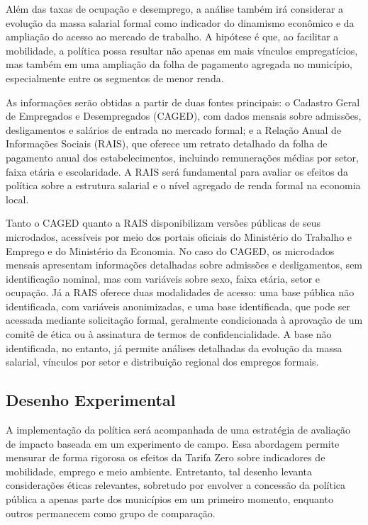 Além das taxas de ocupação e desemprego, a análise também irá considerar a evolução da massa salarial formal como indicador do dinamismo econômico e da ampliação do acesso ao mercado de trabalho. A hipótese é que, ao facilitar a mobilidade, a política possa resultar não apenas em mais vínculos empregatícios, mas também em uma ampliação da folha de pagamento agregada no município, especialmente entre os segmentos de menor renda.

As informações serão obtidas a partir de duas fontes principais: o Cadastro Geral de Empregados e Desempregados (CAGED), com dados mensais sobre admissões, desligamentos e salários de entrada no mercado formal; e a Relação Anual de Informações Sociais (RAIS), que oferece um retrato detalhado da folha de pagamento anual dos estabelecimentos, incluindo remunerações médias por setor, faixa etária e escolaridade. A RAIS será fundamental para avaliar os efeitos da política sobre a estrutura salarial e o nível agregado de renda formal na economia local. 

Tanto o CAGED quanto a RAIS disponibilizam versões públicas de seus microdados, acessíveis por meio dos portais oficiais do Ministério do Trabalho e Emprego e do Ministério da Economia. No caso do CAGED, os microdados mensais apresentam informações detalhadas sobre admissões e desligamentos, sem identificação nominal, mas com variáveis sobre sexo, faixa etária, setor e ocupação. Já a RAIS oferece duas modalidades de acesso: uma base pública não identificada, com variáveis anonimizadas, e uma base identificada, que pode ser acessada mediante solicitação formal, geralmente condicionada à aprovação de um comitê de ética ou à assinatura de termos de confidencialidade. A base não identificada, no entanto, já permite análises detalhadas da evolução da massa salarial, vínculos por setor e distribuição regional dos empregos formais.

\subsection{Desenho Experimental}

A implementação da política será acompanhada de uma estratégia de avaliação de impacto baseada em um experimento de campo. Essa abordagem permite mensurar de forma rigorosa os efeitos da Tarifa Zero sobre indicadores de mobilidade, emprego e meio ambiente. Entretanto, tal desenho levanta considerações éticas relevantes, sobretudo por envolver a concessão da política pública a apenas parte dos municípios em um primeiro momento, enquanto outros permanecem como grupo de comparação.

